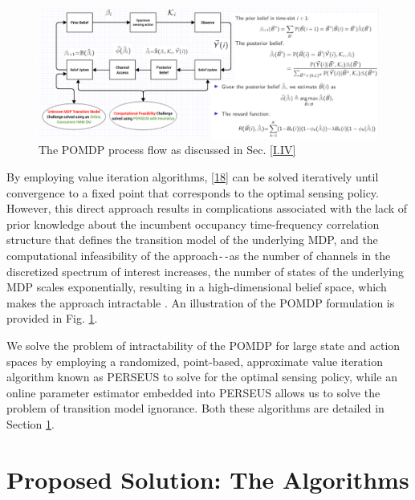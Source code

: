 \documentclass[12pt, draftcls, onecolumn]{IEEEtran}
\begin{document}
\begin{figure} [htb]
    \centerline{
    \includegraphics[width = 1.0\textwidth]{POMDP_Final.PNG}}
    \caption{The POMDP process flow as discussed in Sec. \ref{I.IV}}
    \label{fig: A.add-1}
\end{figure}
By employing value iteration algorithms, \eqref{18} can be solved iteratively until convergence to a fixed point that corresponds to the optimal sensing policy. However, this direct approach results in complications associated with the lack of prior knowledge about the incumbent occupancy time-frequency correlation structure that defines the transition model of the underlying MDP, and the computational infeasibility of the approach\texttt{-{}-}as the number of channels in the discretized spectrum of interest increases, the number of states of the underlying MDP scales exponentially, resulting in a high-dimensional belief space, which makes the approach intractable \cite{WCL:paper}. An illustration of the POMDP formulation is provided in Fig. \ref{fig: A.add-1}.

We solve the problem of intractability of the POMDP for large state and action spaces by employing a randomized, point-based, approximate value iteration algorithm known as PERSEUS \cite{WCL:13} to solve for the optimal sensing policy, while an online parameter estimator embedded into PERSEUS allows us to solve the problem of transition model ignorance. Both these algorithms are detailed in Section \ref{II}.
\section{Proposed Solution: The Algorithms}\label{II}
\end{document}
